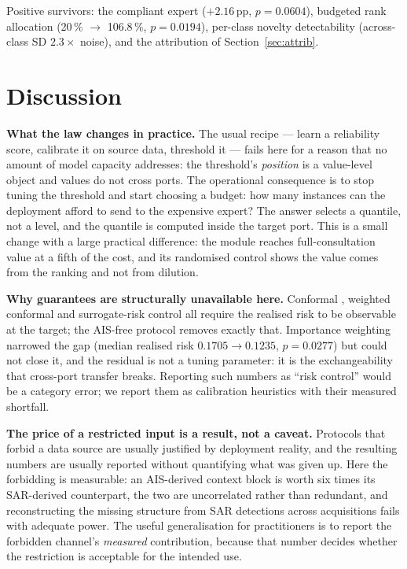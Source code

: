 \documentclass[journal]{IEEEtran}
\begin{document}
Positive survivors: the compliant expert ($+2.16$\,pp, $p = 0.0604$), budgeted rank allocation
(20\,\% $\rightarrow$ 106.8\,\%, $p = 0.0194$), per-class novelty detectability (across-class SD
$2.3\times$ noise), and the attribution of Section~\ref{sec:attrib}.

\section{Discussion}
\label{sec:disc}

\textbf{What the law changes in practice.} The usual recipe --- learn a reliability score, calibrate it
on source data, threshold it --- fails here for a reason that no amount of model capacity addresses:
the threshold's \emph{position} is a value-level object and values do not cross ports. The operational
consequence is to stop tuning the threshold and start choosing a budget: how many instances can the
deployment afford to send to the expensive expert? The answer selects a quantile, not a level, and the
quantile is computed inside the target port. This is a small change with a large practical difference:
the module reaches full-consultation value at a fifth of the cost, and its randomised control shows the
value comes from the ranking and not from dilution.

\textbf{Why guarantees are structurally unavailable here.} Conformal
\cite{tibshirani2019conformal,gibbs2021adaptive}, weighted conformal and surrogate-risk control
\cite{angelopoulos2024riskcontrol} all require the realised risk to be observable at the target; the
AIS-free protocol removes exactly that. Importance weighting narrowed the gap (median realised risk
$0.1705 \rightarrow 0.1235$, $p = 0.0277$) but could not close it, and the residual is not a tuning
parameter: it is the exchangeability that cross-port transfer breaks. Reporting such numbers as ``risk
control'' would be a category error; we report them as calibration heuristics with their measured
shortfall.

\textbf{The price of a restricted input is a result, not a caveat.} Protocols that forbid a data source
are usually justified by deployment reality, and the resulting numbers are usually reported without
quantifying what was given up. Here the forbidding is measurable: an AIS-derived context block is worth
six times its SAR-derived counterpart, the two are uncorrelated rather than redundant, and
reconstructing the missing structure from SAR detections across acquisitions fails with adequate power.
The useful generalisation for practitioners is to report the forbidden channel's \emph{measured}
contribution, because that number decides whether the restriction is acceptable for the intended use.
\end{document}
